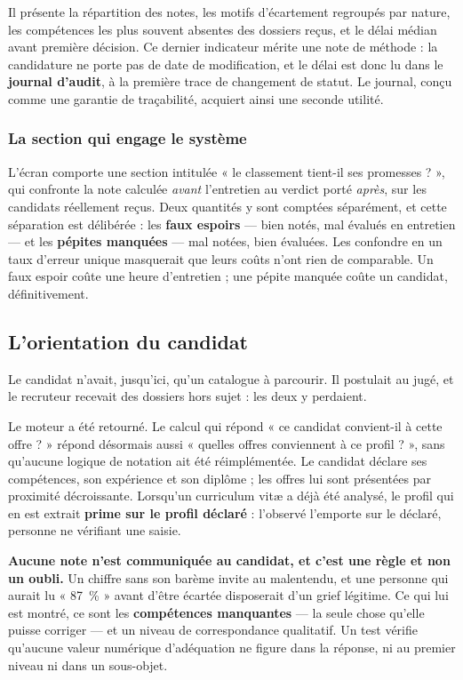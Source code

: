 \documentclass[11pt,a4paper]{article}
\begin{document}
Il présente la répartition des notes, les motifs d'écartement regroupés par nature, les compétences les plus souvent absentes des dossiers reçus, et le délai médian avant première décision. Ce dernier indicateur mérite une note de méthode : la candidature ne porte pas de date de modification, et le délai est donc lu dans le \textbf{journal d'audit}, à la première trace de changement de statut. Le journal, conçu comme une garantie de traçabilité, acquiert ainsi une seconde utilité.

\subsubsection{La section qui engage le système}
L'écran comporte une section intitulée « le classement tient-il ses promesses ? », qui confronte la note calculée \emph{avant} l'entretien au verdict porté \emph{après}, sur les candidats réellement reçus. Deux quantités y sont comptées séparément, et cette séparation est délibérée : les \textbf{faux espoirs} --- bien notés, mal évalués en entretien --- et les \textbf{pépites manquées} --- mal notées, bien évaluées. Les confondre en un taux d'erreur unique masquerait que leurs coûts n'ont rien de comparable. Un faux espoir coûte une heure d'entretien ; une pépite manquée coûte un candidat, définitivement.

\subsection{L'orientation du candidat}
Le candidat n'avait, jusqu'ici, qu'un catalogue à parcourir. Il postulait au jugé, et le recruteur recevait des dossiers hors sujet : les deux y perdaient.

Le moteur a été retourné. Le calcul qui répond « ce candidat convient-il à cette offre ? » répond désormais aussi « quelles offres conviennent à ce profil ? », sans qu'aucune logique de notation ait été réimplémentée. Le candidat déclare ses compétences, son expérience et son diplôme ; les offres lui sont présentées par proximité décroissante. Lorsqu'un curriculum vitæ a déjà été analysé, le profil qui en est extrait \textbf{prime sur le profil déclaré} : l'observé l'emporte sur le déclaré, personne ne vérifiant une saisie.

\medskip
\noindent\textbf{Aucune note n'est communiquée au candidat, et c'est une règle et non un oubli.} Un chiffre sans son barème invite au malentendu, et une personne qui aurait lu « 87~\% » avant d'être écartée disposerait d'un grief légitime. Ce qui lui est montré, ce sont les \textbf{compétences manquantes} --- la seule chose qu'elle puisse corriger --- et un niveau de correspondance qualitatif. Un test vérifie qu'aucune valeur numérique d'adéquation ne figure dans la réponse, ni au premier niveau ni dans un sous-objet.
\end{document}
